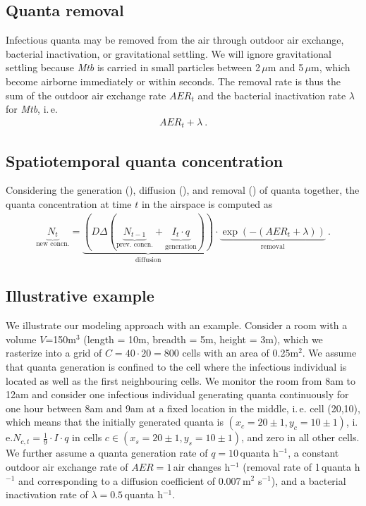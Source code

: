 \documentclass[fleqn,11pt]{wlscirep_supp}
\newcommand\ie{i.\,e.\xspace}
\begin{document}
\subsection{Quanta removal}\label{sec:quanta-removal}

Infectious quanta may be removed from the air through outdoor air exchange, bacterial inactivation, or gravitational settling. We will ignore gravitational settling because \emph{Mtb} is carried in small particles between 2\,$\mu$m and 5\,$\mu$m\cite{Fennelly2020Lancet}, which become airborne immediately or within seconds\cite{Vuorinen2020SafSci}. The removal rate is thus the sum of the outdoor air exchange rate $AER_t$ and the bacterial inactivation rate $\lambda$ for \emph{Mtb}, \ie 
\begin{align}\label{eq:removal}
    AER_t + \lambda ~.
\end{align}

\subsection{Spatiotemporal quanta concentration}

Considering the generation (), diffusion (), and removal () of quanta together, the quanta concentration at time $t$ in the airspace is computed as
\begin{align}\label{eq:spattemp-N}
    \underbrace{N_{t}}_{\text{new concn.}} = \underbrace{\left(D \Delta (\underbrace{N_{t-1}}_{\text{prev. concn.}} + \underbrace{I_t \cdot q}_{\text{generation}})\right)}_{\text{diffusion}} \cdot \underbrace{\exp\left(-(AER_t + \lambda)\right)}_{\text{removal}} ~.
\end{align}

\subsection{Illustrative example}\label{sec:example}

We illustrate our modeling approach with an example. Consider a room with a volume $V$=150m$^3$ (length = 10m, breadth = 5m, height = 3m), which we rasterize into a grid of $C = 40 \cdot 20 = 800$ cells with an area of 0.25m$^2$. We assume that quanta generation is confined to the cell where the infectious individual is located as well as the first neighbouring cells. We monitor the room from 8am to 12am and consider one infectious individual generating quanta continuously for one hour between 8am and 9am at a fixed location in the middle, \ie cell (20,10), which means that the initially generated quanta is $(x_c = 20\pm1, y_c = 10\pm1)$, \ie $N_{c,t} = \frac{1}{9} \cdot I \cdot q$ in cells $c \in (x_s = 20\pm1, y_s = 10\pm1)$, and zero in all other cells. We further assume a quanta generation rate of $q = 10$\,quanta h$^{-1}$, a constant outdoor air exchange rate of $AER = 1$\,air changes h$^{-1}$ (removal rate of 1\,quanta h$^{-1}$ and corresponding to a diffusion coefficient of 0.007\,m$^2$ s$^{-1}$), and a bacterial inactivation rate of $\lambda = 0.5$\,quanta h$^{-1}$. 
\end{document}
